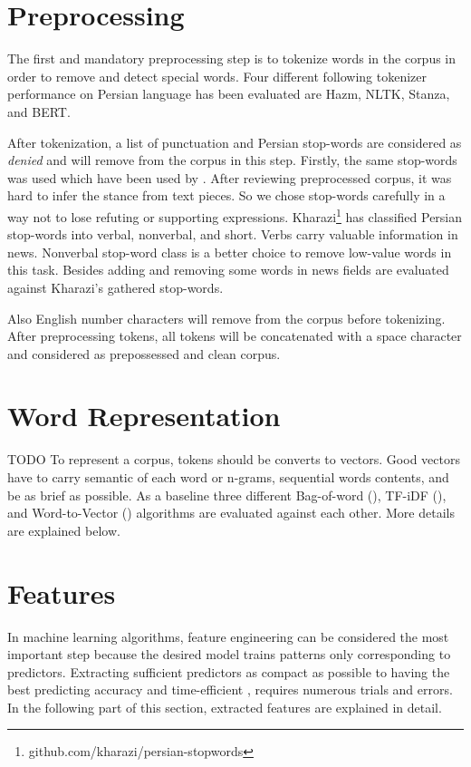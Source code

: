 

\section{Preprocessing}
The first and mandatory preprocessing step is to tokenize words in the corpus in order to remove and detect special words. Four different following tokenizer performance on Persian language has been evaluated are Hazm, NLTK, Stanza, and BERT. 


After tokenization, a list of punctuation and Persian stop-words are considered as \textit{denied} and will remove from the corpus in this step. Firstly, the same stop-words was used which have been used by \cite{stance_persian}. After reviewing preprocessed corpus, it was hard to infer the stance from text pieces. So we chose stop-words carefully in a way not to lose refuting or supporting expressions. Kharazi\footnote{\label{fn:kharazi}github.com/kharazi/persian-stopwords} has classified Persian stop-words into verbal, nonverbal, and short. Verbs carry valuable information in news. Nonverbal stop-word class is a better choice to remove low-value words in this task. Besides adding and removing some words in news fields are evaluated against Kharazi's gathered stop-words. 

Also English number characters will remove from the corpus before tokenizing. After preprocessing tokens, all tokens will be concatenated with a space character and considered as prepossessed and clean corpus.


\section{Word Representation}
{\color{green} TODO}
To represent a corpus, tokens should be converts to vectors. Good vectors have to carry semantic of each word or n-grams, sequential words contents, and be as brief as possible. As a baseline three different Bag-of-word (\cite{bow}), TF-iDF (\cite{tfidf}), and Word-to-Vector (\cite{word2vec}) algorithms are evaluated against each other. More details are explained below.

\section{Features}
\label{sec:features}
In machine learning algorithms, feature engineering can be considered the most important step because the desired model trains patterns only corresponding to predictors. Extracting sufficient predictors as compact as possible to having the best predicting accuracy and time-efficient	, requires numerous trials and errors. In the following part of this section, extracted features are explained in detail.
